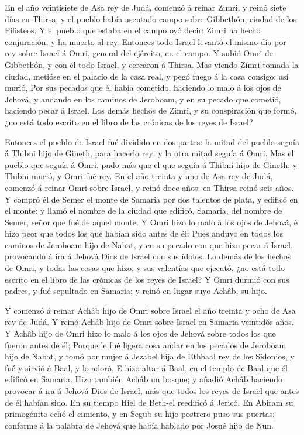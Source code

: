  En el año veintisiete de Asa rey de Judá, comenzó á reinar
Zimri, y reinó siete días en Thirsa; y el pueblo había asentado campo
sobre Gibbethón, ciudad de los Filisteos.  Y el pueblo que
estaba en el campo oyó decir: Zimri ha hecho conjuración, y ha muerto al
rey. Entonces todo Israel levantó el mismo día por rey sobre Israel á
Omri, general del ejército, en el campo.  Y subió Omri de
Gibbethón, y con él todo Israel, y cercaron á Thirsa.  Mas
viendo Zimri tomada la ciudad, metióse en el palacio de la casa real, y
pegó fuego á la casa consigo: así murió,  Por sus pecados
que él había cometido, haciendo lo malo á los ojos de Jehová, y andando
en los caminos de Jeroboam, y en su pecado que cometió, haciendo pecar á
Israel.  Los demás hechos de Zimri, y su conspiración que
formó, ¿no está todo escrito en el libro de las crónicas de los reyes de
Israel?

 Entonces el pueblo de Israel fué dividido en dos partes:
la mitad del pueblo seguía á Thibni hijo de Gineth, para hacerlo rey: y
la otra mitad seguía á Omri.  Mas el pueblo que seguía á
Omri, pudo más que el que seguía á Thibni hijo de Gineth; y Thibni
murió, y Omri fué rey.  En el año treinta y uno de Asa rey
de Judá, comenzó á reinar Omri sobre Israel, y reinó doce años: en
Thirsa reinó seis años.  Y compró él de Semer el monte de
Samaria por dos talentos de plata, y edificó en el monte: y llamó el
nombre de la ciudad que edificó, Samaria, del nombre de Semer, señor que
fué de aquel monte.  Y Omri hizo lo malo á los ojos de
Jehová, é hizo peor que todos los que habían sido antes de él:
 Pues anduvo en todos los caminos de Jeroboam hijo de
Nabat, y en su pecado con que hizo pecar á Israel, provocando á ira á
Jehová Dios de Israel con sus ídolos.  Lo demás de los
hechos de Omri, y todas las cosas que hizo, y sus valentías que ejecutó,
¿no está todo escrito en el libro de las crónicas de los reyes de
Israel?  Y Omri durmió con sus padres, y fué sepultado en
Samaria; y reinó en lugar suyo Achâb, su hijo.

 Y comenzó á reinar Achâb hijo de Omri sobre Israel el año
treinta y ocho de Asa rey de Judá.  Y reinó Achâb hijo de
Omri sobre Israel en Samaria veintidós años. Y Achâb hijo de Omri hizo
lo malo á los ojos de Jehová sobre todos los que fueron antes de él;
 Porque le fué ligera cosa andar en los pecados de Jeroboam
hijo de Nabat, y tomó por mujer á Jezabel hija de Ethbaal rey de los
Sidonios, y fué y sirvió á Baal, y lo adoró.  E hizo altar
á Baal, en el templo de Baal que él edificó en Samaria. 
Hizo también Achâb un bosque; y añadió Achâb haciendo provocar á ira á
Jehová Dios de Israel, más que todos los reyes de Israel que antes de él
habían sido.  En su tiempo Hiel de Beth-el reedificó á
Jericó. En Abiram su primogénito echó el cimiento, y en Segub su hijo
postrero puso sus puertas; conforme á la palabra de Jehová que había
hablado por Josué hijo de Nun.

